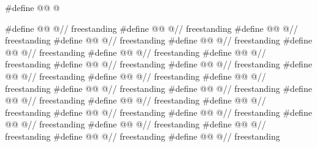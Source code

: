 \begin{codeblock}
#define @@ @\seebelow@

#define @@ @\seebelow@                                                // freestanding
#define @@ @\seebelow@                                               // freestanding
#define @@ @\seebelow@                                           // freestanding
#define @@ @\seebelow@                                        // freestanding
#define @@ @\seebelow@                                         // freestanding
#define @@ @\seebelow@                                               // freestanding
#define @@ @\seebelow@                                             // freestanding
#define @@ @\seebelow@                                                // freestanding
#define @@ @\seebelow@                                              // freestanding
#define @@ @\seebelow@                                                // freestanding
#define @@ @\seebelow@                                            // freestanding
#define @@ @\seebelow@                                               // freestanding
#define @@ @\seebelow@                                         // freestanding
#define @@ @\seebelow@                                         // freestanding
#define @@ @\seebelow@                                           // freestanding
#define @@ @\seebelow@                                              // freestanding
#define @@ @\seebelow@                                         // freestanding
#define @@ @\seebelow@                                                 // freestanding
#define @@ @\seebelow@                                               // freestanding
#define @@ @\seebelow@                                               // freestanding
#define @@ @\seebelow@                                                // freestanding
#define @@ @\seebelow@                                         // freestanding
#define @@ @\seebelow@                                                // freestanding
#define @@ @\seebelow@                                               // freestanding
#define @@ @\seebelow@                                          // freestanding

\end{codeblock}
